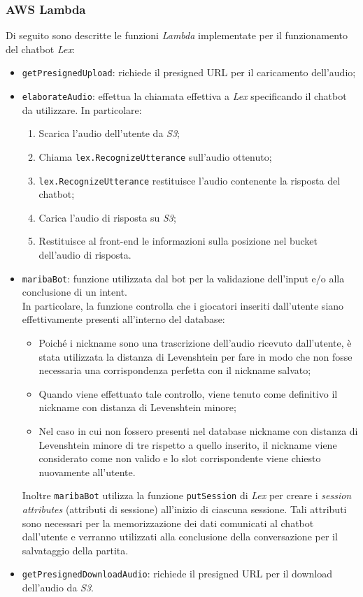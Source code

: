 		\subsubsection{AWS Lambda}
		Di seguito sono descritte le funzioni \emph{Lambda} implementate per il funzionamento del \gls{chatbot} \emph{Lex}:
		\begin{itemize}
			\item \texttt{getPresignedUpload}: richiede il presigned URL per il caricamento dell'audio;
			
			\item \texttt{elaborateAudio}: effettua la chiamata effettiva a \emph{Lex} specificando il \gls{chatbot} da utilizzare. In particolare:
			\begin{enumerate}
				\item Scarica l'audio dell'utente da \emph{S3};
				\item Chiama \texttt{lex.RecognizeUtterance} sull'audio ottenuto;
				\item \texttt{lex.RecognizeUtterance} restituisce l'audio contenente la risposta del \gls{chatbot};
				\item Carica l'audio di risposta su \emph{S3};
				\item Restituisce al front-end le informazioni sulla posizione nel bucket dell'audio di risposta.
			\end{enumerate}
			
			\item \texttt{maribaBot}: funzione utilizzata dal bot per la validazione dell'input e/o alla conclusione di un intent. \\
			In particolare, la funzione controlla che i giocatori inseriti dall'utente siano effettivamente presenti all'interno del database:
			\begin{itemize}
				\item Poiché i nickname sono una trascrizione dell'audio ricevuto dall'utente, è stata utilizzata la 
				\gls{distanza di Levenshtein} per fare in modo che non fosse necessaria una corrispondenza perfetta 
				con il nickname salvato;
				\item Quando viene effettuato tale controllo, viene tenuto come definitivo il nickname con \gls{distanza di Levenshtein} minore;
				\item  Nel caso in cui non fossero presenti nel database nickname con \gls{distanza di Levenshtein} minore di tre rispetto a quello inserito, il nickname viene considerato come non valido e lo slot corrispondente viene chiesto nuovamente all'utente.
			\end{itemize}
			Inoltre \texttt{maribaBot} utilizza la funzione \texttt{putSession} di \emph{Lex} per creare i \emph{session attributes} (attributi di sessione) all'inizio di ciascuna sessione. Tali attributi sono necessari per la memorizzazione dei dati comunicati al \gls{chatbot} dall'utente e verranno utilizzati alla conclusione della conversazione per il salvataggio della partita.
		
			\item \texttt{getPresignedDownloadAudio}: richiede il presigned URL per il download dell'audio da \emph{S3}.
			
		\end{itemize}
		
